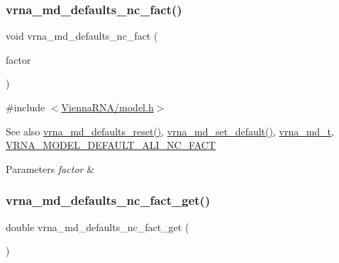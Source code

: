 \subsubsection{\texorpdfstring{vrna\+\_\+md\+\_\+defaults\+\_\+nc\+\_\+fact()}{vrna\_md\_defaults\_nc\_fact()}}
{\footnotesize\ttfamily void vrna\+\_\+md\+\_\+defaults\+\_\+nc\+\_\+fact (\begin{DoxyParamCaption}\item[{double}]{factor }\end{DoxyParamCaption})}



{\ttfamily \#include $<$\mbox{\hyperlink{model_8h}{Vienna\+R\+N\+A/model.\+h}}$>$}

\begin{DoxySeeAlso}{See also}
\mbox{\hyperlink{group__model__details_ga70834424cf804d149937de89f80ceb45}{vrna\+\_\+md\+\_\+defaults\+\_\+reset()}}, \mbox{\hyperlink{group__model__details_ga8ac6ff84936282436f822644bf841f66}{vrna\+\_\+md\+\_\+set\+\_\+default()}}, \mbox{\hyperlink{group__model__details_ga1f8a10e12a0a1915f2a4eff0b28ea17c}{vrna\+\_\+md\+\_\+t}}, \mbox{\hyperlink{group__model__details_ga8f774daaafec28160c1ca5d09f2cbdba}{V\+R\+N\+A\+\_\+\+M\+O\+D\+E\+L\+\_\+\+D\+E\+F\+A\+U\+L\+T\+\_\+\+A\+L\+I\+\_\+\+N\+C\+\_\+\+F\+A\+CT}} 
\end{DoxySeeAlso}

\begin{DoxyParams}{Parameters}
{\em factor} & \\
\hline
\end{DoxyParams}
\mbox{\label{group__model__details_ga7ac759eaa7159bf5f022745f5da59508}} 
\subsubsection{\texorpdfstring{vrna\+\_\+md\+\_\+defaults\+\_\+nc\+\_\+fact\+\_\+get()}{vrna\_md\_defaults\_nc\_fact\_get()}}
{\footnotesize\ttfamily double vrna\+\_\+md\+\_\+defaults\+\_\+nc\+\_\+fact\+\_\+get (\begin{DoxyParamCaption}\item[{void}]{ }\end{DoxyParamCaption})}



